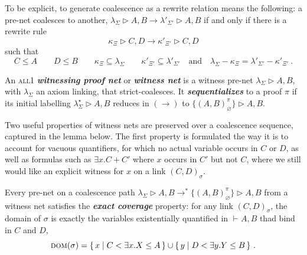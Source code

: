 \documentclass[UKenglish]{lipics-v2016}
\theoremstyle{plain}
\newcommand\defn[1]{\textit{\textbf{#1}}}
\newcommand\varA{\textsc{var}^\forall}
\newcommand\all{\textsc{all}}
\newcommand\dom[1]{\textsc{dom}(#1)}
\newcommand\+{+}
\renewcommand\*{\times}
\newcommand\seq[3][]{{\vdash_{#1}}#2,#3}
\newcommand\net[3]{#1\triangleright #2,#3}
\newcommand\link[3][\sigma]{(#2,#3)_{#1}}
\newcommand\scoal{\rightarrow} %
\begin{document}
To be explicit, to generate coalescence as a rewrite relation means the following: a pre-net coalesces to another, $\net{\lambda_\Sigma} AB\scoal \net{{\lambda'_{\Sigma'}}}AB$ if and only if there is a rewrite rule
\[
	\net{\kappa_\Xi} CD\scoal\net{\kappa'_{\Xi'}} CD
\] 
such that 
\[
	C\leq A \qquad
	D\leq B \qquad
	\kappa_\Xi\subseteq\lambda_\Sigma \qquad
	\kappa'_{\Xi'}\subseteq\lambda'_{\Sigma'} \quad
	\text{and} \quad
	\lambda_\Sigma-\kappa_\Xi=\lambda'_{\Sigma'}-\kappa'_{\Xi'}~.
\]

\begin{definition}
An \all1 \defn{witnessing proof net} or \defn{witness net} is a witness pre-net $\net{\lambda_\Sigma}AB$, with $\lambda_\Sigma$ an axiom linking, that strict-coalesces. It \defn{sequentializes} to a proof $\pi$ if its initial labelling $\net{\lambda_\Sigma^\star}AB$ reduces in $(\scoal)$ to $\net{\{\link[\varnothing]AB^\pi\}}AB$.
\end{definition}

Two useful properties of witness nets are preserved over a coalescence sequence, captured in the lemma below. The first property is formulated the way it is to account for vacuous quantifiers, for which no actual variable occurs in $C$ or $D$, as well as formulas such as $\exists x.C\+C'$ where $x$ occurs in $C'$ but not $C$, where we still would like an explicit witness for $x$ on a link $\link CD$. 


\begin{lemma}
Every pre-net on a coalescence path $\net{\lambda_\Sigma}AB \scoal^* \net{\{\link[\varnothing]AB^\pi\}}AB$ from a witness net satisfies the \defn{exact coverage} property: for any link $\link CD$, the domain of $\sigma$ is exactly the variables existentially quantified in $\seq AB$ thad bind in $C$ and $D$,
\[
	\dom\sigma = \{\,x \mid C < \exists x.X \leq A\,\}
			\cup \{\,y \mid D < \exists y.Y \leq B\,\}~.
\]
\end{lemma}

%
%
\end{document}
